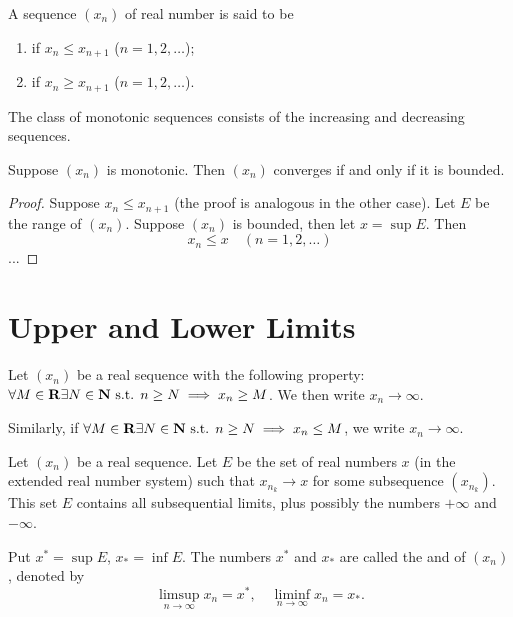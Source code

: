 \begin{definition}
A sequence $(x_n)$ of real number is said to be
\begin{enumerate}[label=(\roman*)]
\item {} if $x_n\le x_{n+1}$ ($n=1,2,\dots$);
\item {} if $x_n\ge x_{n+1}$ ($n=1,2,\dots$).
\end{enumerate}
The class of monotonic sequences consists of the increasing and decreasing sequences.
\end{definition}

\begin{lemma}
Suppose $(x_n)$ is monotonic. Then $(x_n)$ converges if and only if it is bounded.
\end{lemma}

\begin{proof}
Suppose $x_n\le x_{n+1}$ (the proof is analogous in the other case). Let $E$ be the range of $(x_n)$. Suppose $(x_n)$ is bounded, then let $x=\sup E$. Then
\[x_n\le x\quad(n=1,2,\dots)\]
...
\end{proof}

\section{Upper and Lower Limits}
\begin{definition}
Let $(x_n)$ be a real sequence with the following property: $\forall M\in\mathbf R\exists N\in\mathbf N\text{ s.t. } n\ge N\implies x_n\ge M$. We then write $x_n\to\infty$.

Similarly, if $\forall M\in\mathbf R\exists N\in\mathbf N\text{ s.t. } n\ge N\implies x_n\le M$, we write $x_n\to\infty$.
\end{definition}

\begin{definition}\label{defn:upper-lower-limit}
Let $(x_n)$ be a real sequence. Let $E$ be the set of real numbers $x$ (in the extended real number system) such that $x_{n_k}\to x$ for some subsequence $(x_{n_k})$. This set $E$ contains all subsequential limits, plus possibly the numbers $+\infty$ and $-\infty$.

Put $x^*=\sup E$, $x_*=\inf E$. The numbers $x^*$ and $x_*$ are called the  and  of $(x_n)$, denoted by
\[\limsup_{n\to\infty}x_n=x^*,\quad\liminf_{n\to\infty}x_n=x_*.\]
\end{definition}

